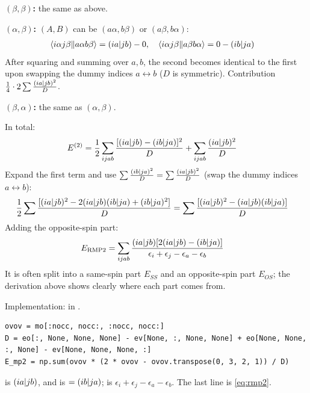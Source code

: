 \textbf{$(\beta, \beta)$:} the same as above.

\textbf{$(\alpha, \beta)$:} $(A, B)$ can be $(a \alpha, b \beta)$ or $(a \beta, b \alpha)$:
\begin{align*}
\langle i\alpha j\beta\Vert a\alpha b\beta\rangle &= (ia\vert jb) - 0, \quad \langle i\alpha j\beta\Vert a\beta b\alpha\rangle = 0 - (ib\vert ja)
\end{align*}
After squaring and summing over $a, b$, the second becomes identical to the first upon swapping the dummy indices $a \leftrightarrow b$ ($D$ is symmetric). Contribution $\frac{1}{4} \cdot 2 \sum \frac{(ia\vert jb)^2}{D}$.

\textbf{$(\beta, \alpha)$:} the same as $(\alpha, \beta)$.

In total:
\begin{align*}
E^{(2)} &= \frac{1}{2} \sum_{ijab} \frac{[(ia\vert jb) - (ib\vert ja)]^2}{D} + \sum_{ijab} \frac{(ia\vert jb)^2}{D}
\end{align*}
Expand the first term and use $\sum \frac{(ib\vert ja)^2}{D} = \sum \frac{(ia\vert jb)^2}{D}$ (swap the dummy indices $a \leftrightarrow b$):
\begin{align*}
\frac{1}{2} \sum \frac{[(ia\vert jb)^2 - 2 (ia\vert jb)(ib\vert ja) + (ib\vert ja)^2]}{D} &= \sum \frac{[(ia\vert jb)^2 - (ia\vert jb)(ib\vert ja)]}{D}
\end{align*}
Adding the opposite-spin part:
\begin{align}\label{eq:rmp2}
E_{\text{RMP2}} &= \sum_{ijab} \frac{(ia\vert jb) [2 (ia\vert jb) - (ib\vert ja)]}{\epsilon_i + \epsilon_j - \epsilon_a - \epsilon_b}
\end{align}
It is often split into a same-spin part $E_{SS}$ and an opposite-spin part $E_{OS}$; the derivation above shows clearly where each part comes from.

Implementation:  in .

\begin{codemap}
\begin{lstlisting}[frame=none, numbers=none, xleftmargin=0pt, backgroundcolor={}]
ovov = mo[:nocc, nocc:, :nocc, nocc:]
D = eo[:, None, None, None] - ev[None, :, None, None] + eo[None, None, :, None] - ev[None, None, None, :]
E_mp2 = np.sum(ovov * (2 * ovov - ovov.transpose(0, 3, 2, 1)) / D)
\end{lstlisting}
 is $(ia\vert jb)$, and  is  $= (ib\vert ja)$;  is $\epsilon_i + \epsilon_j - \epsilon_a - \epsilon_b$. The last line is \eqref{eq:rmp2}.
\end{codemap}

